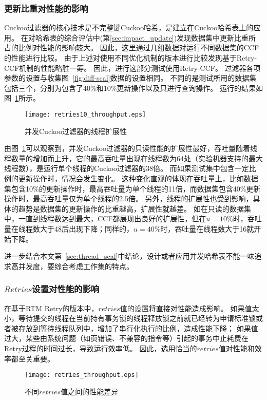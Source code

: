 \subsubsection{更新比重对性能的影响}
Cuckoo过滤器的核心技术是不完整键Cuckoo哈希，是建立在Cuckoo哈希表上的应用。
在对哈希表的综合评估中(第\ref{sec:impact_update})发现数据集中更新比重所占的比例对性能的影响较大。
因此，这里通过几组数据对运行不同数据集的CCF的性能进行比较。
由于上述对使用不同优化机制的版本进行比较发现基于Retry-CCF机制的性能略胜一筹。
因此，进行这部分测试使用Retry-CCF。
过滤器各项参数的设置与收集图~\ref{fig:diff-scal}数据的设置相同。
不同的是测试所用的数据集包括三个，分别为包含了40\%和10\%更新操作以及只进行查询操作。
运行的结果如图~\ref{fig:retry_thp}所示。

\begin{figure}[htbp]
\centering
\texttt{[image: retries10\_throughput.eps]}
\caption{并发Cuckoo过滤器的线程扩展性}\label{fig:retry_thp}
\end{figure}

由图~\ref{fig:retry_thp}可以观察到，并发Cuckoo过滤器的只读性能的扩展性最好，吞吐量随着线程数量的增加而上升，它的最高吞吐量出现在线程数为64处（实验机器支持的最大线程数），是运行单个线程的Cuckoo过滤器的38倍。
而如果测试集中包含一定比例的更新操作时，情况会发生变化。
这种变化直观的体现在吞吐量上，比如数据集包含10\%的更新操作时，最高吞吐量为单个线程的11倍，而数据集包含40\%更新操作时，最高吞吐量仅为单个线程的2.5倍。
另外，线程的扩展性也受到影响，具体的趋势是数据集的更新操作的比重越高，扩展性就越差。
如在只读的数据集中，一直到线程数达到最大，CCF都展现出良好的扩展性，但在$u = 10\%$时，吞吐量在线程数大于48后出现下降；同样的，$u = 40\%$时，吞吐量在线程数大于16就开始下降。

进一步结合本文第~\ref{sec:thread_scal}中结论，设计或者应用并发哈希表不能一味追求高并发度，要综合考虑工作集的特点。

\subsubsection{$Retries$设置对性能的影响}
在基于RTM Retry的版本中，$retries$值的设置将直接对性能造成影响。
如果值太小，等待提交的线程在当前持有事务锁的线程释放锁之前就已经转为申请标准锁或者被存放到等待线程队列中，增加了串行化执行的比例，造成性能下降；
如果值过大，某些由系统问题（如页错误、不兼容的指令等）引起的事务中止耗费在Retry过程的时间过长，导致运行效率低。
因此，选用恰当的$retries$值对性能和效率都至关重要。

\begin{figure}[htbp]
\centering
\texttt{[image: retries\_throughput.eps]}
\caption{不同$retries$值之间的性能差异}\label{fig:diff-retry}
\end{figure}

